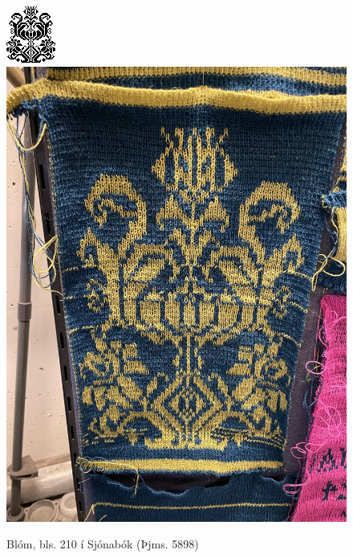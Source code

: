 \documentclass[a4paper,12pt,twoside]{article}
\begin{document}
\begin{figure}[p]
    \centering
    \includegraphics[height=.20\textheight]{myndir/thjms5898_210.png}
    \hspace{24pt}
    \includegraphics[height=.25\textheight]{myndir/flower.jpg}
    \caption{Blóm, bls. 210 í Sjónabók (Þjms. 5898)}
    \label{fig:flower}
\end{figure}
\end{document}
